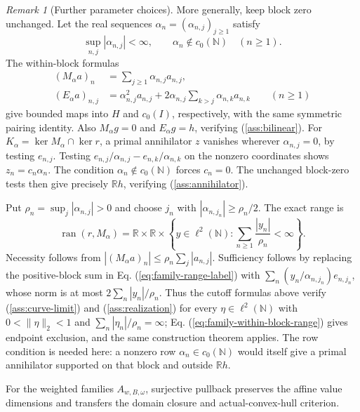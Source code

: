 \documentclass[11pt]{article}
\newcommand{\R}{\mathbb R}
\newcommand{\N}{\mathbb N}
\theoremstyle{definition}
\theoremstyle{remark}
\newtheorem{remark}{Remark}
\begin{document}
\begin{remark}[Further parameter choices]
More generally, keep block zero unchanged. Let the real sequences $\alpha_n=(\alpha_{n,j})_{j\ge1}$ satisfy
\[
\sup_{n,j}|\alpha_{n,j}|<\infty,
\qquad \alpha_n\notin c_0(\N)\quad(n\ge1).
\]
The within-block formulas
\begin{equation}
\begin{aligned}
(M_\alpha a)_n&=\sum_{j\ge1}\alpha_{n,j}a_{n,j},\\
(E_\alpha a)_{n,j}&=\alpha_{n,j}^2a_{n,j}
 +2\alpha_{n,j}\sum_{k>j}\alpha_{n,k}a_{n,k}
\qquad(n\ge1)
\end{aligned}
\label{eq:family-within-block}
\end{equation}
give bounded maps into $H$ and $c_0(I)$, respectively, with the same symmetric pairing identity. Also $M_\alpha g=0$ and $E_\alpha g=h$, verifying \textup{(\ref{ass:bilinear})}. For $K_\alpha=\ker M_\alpha\cap\ker r$, a primal annihilator $z$ vanishes wherever $\alpha_{n,j}=0$, by testing $e_{n,j}$. Testing $e_{n,j}/\alpha_{n,j}-e_{n,k}/\alpha_{n,k}$ on the nonzero coordinates shows $z_n=c_n\alpha_n$. The condition $\alpha_n\notin c_0(\N)$ forces $c_n=0$. The unchanged block-zero tests then give precisely $\R h$, verifying \textup{(\ref{ass:annihilator})}.

Put $\rho_n=\sup_j|\alpha_{n,j}|>0$ and choose $j_n$ with $|\alpha_{n,j_n}|\ge\rho_n/2$. The exact range is
\begin{equation}
\operatorname{ran}(r,M_\alpha)
=\R\times\R\times
\left\{y\in\ell^2(\N):\sum_{n\ge1}\frac{|y_n|}{\rho_n}<\infty\right\}.
\label{eq:family-within-block-range}
\end{equation}
Necessity follows from $|(M_\alpha a)_n|\le\rho_n\sum_j|a_{n,j}|$. Sufficiency follows by replacing the positive-block sum in Eq. (\ref{eq:family-range-label}) with $\sum_n(y_n/\alpha_{n,j_n})e_{n,j_n}$, whose norm is at most $2\sum_n|y_n|/\rho_n$. Thus the cutoff formulas above verify \textup{(\ref{ass:curve-limit})} and \textup{(\ref{ass:realization})} for every $\eta\in\ell^2(\N)$ with $0<\|\eta\|_2<1$ and $\sum_n|\eta_n|/\rho_n=\infty$; Eq. (\ref{eq:family-within-block-range}) gives endpoint exclusion, and the same construction theorem applies. The row condition is needed here: a nonzero row $\alpha_n\in c_0(\N)$ would itself give a primal annihilator supported on that block and outside $\R h$.
\end{remark}

For the weighted families $A_{w,B,\omega}$, surjective pullback preserves the affine value dimensions and transfers the domain closure and actual-convex-hull criterion.
\end{document}
